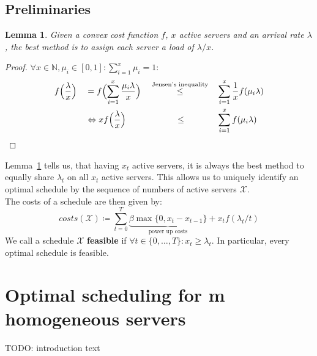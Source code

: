 \documentclass[hidelinks]{article}
\theoremstyle{plain}
\newtheorem{lem}[thm]{Lemma}
\theoremstyle{definition}
\theoremstyle{rem}
\newcommand{\mx}{\mathcal{X}}
\begin{document}
\begin{sloppypar}
\subsection{Preliminaries}
\begin{lem}\label{lem:share}
	Given a convex cost function $f$, $x$ active servers and an arrival rate $\lambda$, the best method is to assign each server a load of $\lambda/x$.
\end{lem}
\begin{proof}
$\forall x\in\mathbb{N},\mu_i\in[0,1]:\sum\limits_{i=1}^{x}{\mu_i}=1:$
\begin{alignat*}{4}
	&f\Bigl(\frac{\lambda}{x}\Bigr)&&=f\Bigl(\sum\limits_{i=1}^x{\frac{\mu_i\lambda}{x}}\Bigr)&&\stackrel{\text{Jensen's inequality}}{\le}&&\sum\limits_{i=1}^x\frac{1}{x}f(\mu_i\lambda) \\
	&&&\Leftrightarrow xf\Bigl(\frac{\lambda}{x}\Bigr)&&\qquad\quad\le&&\sum\limits_{i=1}^xf(\mu_i\lambda)
\end{alignat*}
\end{proof}
Lemma~\ref{lem:share} tells us, that having $x_t$ active servers, it is always the best method to equally share $\lambda_t$ on all $x_t$ active servers. This allows us to uniquely identify an optimal schedule by the sequence of numbers of active servers $\mx$.\\ The costs of a schedule are then given by:
\begin{equation*}
	costs(\mx)\coloneqq\sum\limits_{t=0}^{T}{\underbrace{\beta\max\{0,x_{t}-x_{t-1}\}}_{\text{power up costs}}+x_tf(\lambda_t/t)}
\end{equation*}
We call a schedule $\mx$ \textbf{feasible} if $\forall t\in\{0,\ldots,T\}: x_t\ge\lambda_t$. In particular, every optimal schedule is feasible.

\section{Optimal scheduling for m homogeneous servers}\label{sec:opt}
TODO: introduction text


\end{sloppypar}
\end{document}
